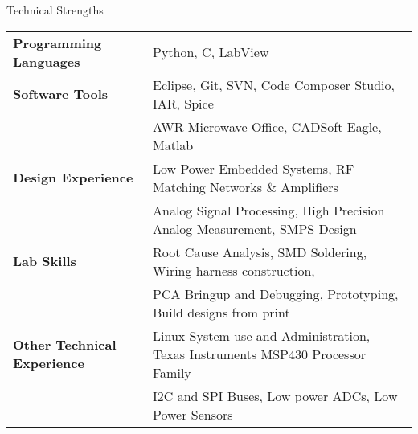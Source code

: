 \documentclass{resume} %
\begin{document}
\begin{rSection}{Technical Strengths}

\begin{tabular}{ @{} >{\bfseries}l @{\hspace{6ex}} l }
Programming Languages & Python, C, LabView  \smallskip \\

Software Tools & Eclipse, Git, SVN, Code Composer Studio, IAR, Spice\\ 
 & AWR Microwave Office, CADSoft Eagle, Matlab \smallskip \\

Design Experience & Low Power Embedded Systems, RF Matching Networks \& Amplifiers\\
 & Analog Signal Processing, High Precision Analog Measurement, SMPS Design \smallskip \\
 
Lab Skills & Root Cause Analysis, SMD Soldering, Wiring harness construction,\\
& PCA Bringup and Debugging, Prototyping, Build designs from print\smallskip \\
 
Other Technical Experience & Linux System use and Administration, Texas Instruments MSP430 Processor Family \\
& I2C and SPI Buses, Low power ADCs, Low Power Sensors\\
\end{tabular}

\end{rSection}
\medskip

\end{document}
